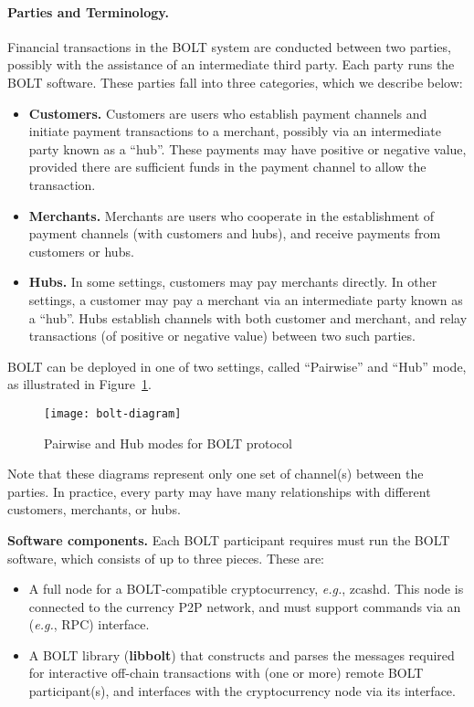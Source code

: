 \documentclass[11pt]{report}
\begin{document}
\paragraph{Parties and Terminology.} Financial transactions in the BOLT system are conducted between two parties, possibly with the assistance of an intermediate third party. Each party runs the BOLT software. These parties fall into three categories, which we describe below:
\begin{itemize}
\item {\bf Customers.} Customers are users who establish payment channels and initiate payment transactions to a merchant, possibly via an intermediate party known as a ``hub''. These payments may have positive or negative value, provided there are sufficient funds in the payment channel to allow the transaction.
\item {\bf Merchants.} Merchants are users who cooperate in the establishment of payment channels (with customers and hubs), and receive payments from customers or hubs.
\item {\bf Hubs.} In some settings, customers may pay merchants directly. In other settings, a customer may pay a merchant via an intermediate party known as a ``hub''. Hubs establish channels with both customer and merchant, and relay transactions (of positive or negative value) between two such parties.
\end{itemize} 

BOLT can be deployed in one of two settings, called ``Pairwise'' and ``Hub'' mode, as illustrated in Figure~\ref{fig:bolt}.

\begin{figure}
  \caption{Pairwise and Hub modes for BOLT protocol}
  \centering
    \texttt{[image: bolt-diagram]}
\label{fig:bolt}
\end{figure}

Note that these diagrams represent only one set of channel(s) between the parties. In practice, every party may have many relationships with different customers, merchants, or hubs.

\noindent
{\bf Software components.} Each BOLT participant requires must run the BOLT software, which consists of up to three pieces. These are:

\begin{itemize}
\item A full node for a BOLT-compatible cryptocurrency, {\em e.g.}, zcashd. This node is connected to the currency P2P network, and must support commands via an ({\em e.g.}, RPC) interface.
\item A BOLT library ({\bf libbolt}) that constructs and parses the messages required for interactive off-chain transactions with (one or more) remote BOLT participant(s), and interfaces with the cryptocurrency node via its interface.
\end{itemize}
\end{document}
